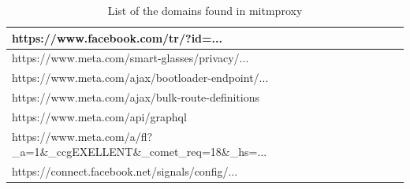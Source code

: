 \begin{table}[H]
\begin{tabular}{|l|l|}
        https://www.facebook.com/tr/?id=... \\ \hline
        https://www.meta.com/smart-glasses/privacy/... \\ \hline
        https://www.meta.com/ajax/bootloader-endpoint/... \\ \hline
        https://www.meta.com/ajax/bulk-route-definitions \\ \hline
        https://www.meta.com/api/graphql \\ \hline
        https://www.meta.com/a/fl?\_a=1\&\_ccgEXELLENT\&\_comet\_req=18\&\_hs=... \\ \hline
        https://connect.facebook.net/signals/config/... \\ \hline
    \end{tabular}
    \caption{List of the domains found in mitmproxy}
    \label{tab:domain_mitmproxy}
\end{table}


